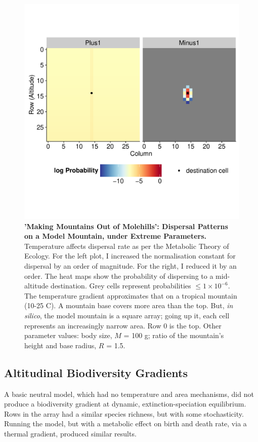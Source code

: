 \documentclass[11pt]{article}
\begin{document}
\newpage
\begin{figure}[!hbtp]

	\includegraphics[width=1\linewidth]{../Results/DispMaps/AreaTemp_B0.pdf}
	\vspace*{-3cm}
	\caption{\textbf{'Making Mountains Out of Molehills': Dispersal Patterns on a Model Mountain, under Extreme Parameters.} Temperature affects dispersal rate as per the Metabolic Theory of Ecology. For the left plot, I increased the normalisation constant for dispersal by an order of magnitude. For the right, I reduced it by an order. The heat maps show the probability of dispersing to a mid-altitude destination. Grey cells represent probabilities $\leq 1 \times 10^{-6}$. The temperature gradient approximates that on a tropical mountain (10-25 \degree C). A mountain base covers more area than the top. But, \emph{in silico}, the model mountain is a square array; going up it, each cell represents an increasingly narrow area. Row 0 is the top. Other parameter values: body size, $M$ = 100 g; ratio of the mountain's height and base radius, $R$ = 1.5.}
\label{DispMapB0}
\end{figure}


\newpage
\subsection*{Altitudinal Biodiversity Gradients}
A basic neutral model, which had no temperature and area mechanisms, did not produce a biodiversity gradient at dynamic, extinction-speciation equilibrium. Rows in the array had a similar species richness, but with some stochasticity. Running the model, but with a metabolic effect on birth and death rate, via a thermal gradient, produced similar results.
\end{document}
